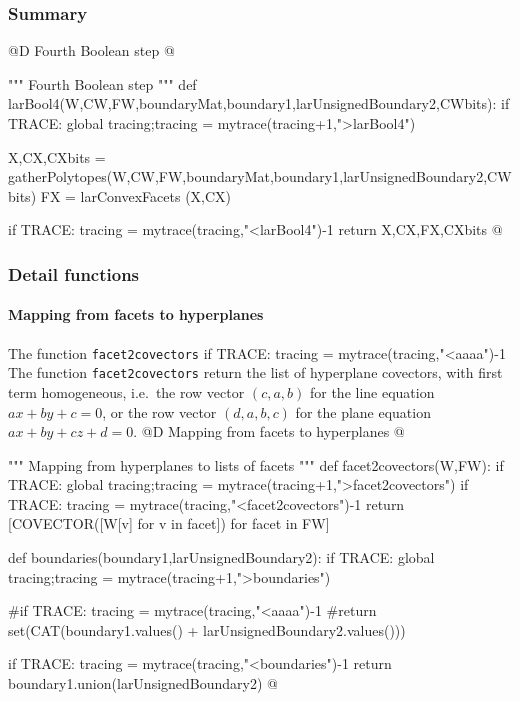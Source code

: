 \documentclass[11pt,oneside]{article}	%
\begin{document}
\subsubsection{Summary}


@D Fourth Boolean step
@{""" Fourth Boolean step """
def larBool4(W,CW,FW,boundaryMat,boundary1,larUnsignedBoundary2,CWbits):
	if TRACE: global tracing;tracing = mytrace(tracing+1,">larBool4")

	X,CX,CXbits = gatherPolytopes(W,CW,FW,boundaryMat,boundary1,larUnsignedBoundary2,CWbits)
	FX = larConvexFacets (X,CX)

	if TRACE: tracing = mytrace(tracing,"<larBool4")-1
	return X,CX,FX,CXbits
@}


\subsubsection{Detail functions}




\paragraph{Mapping from facets to hyperplanes}

The function \texttt{facet2covectors} if TRACE: tracing = mytrace(tracing,"<aaaa")-1
The function \texttt{facet2covectors} return the list of hyperplane covectors, with first term homogeneous, i.e.~the row vector $(c,a,b)$ for the line equation $ax+by+c=0$, or the row vector $(d,a,b,c)$ for the plane equation $ax+by+cz+d=0$.
@D Mapping from facets to hyperplanes
@{""" Mapping from hyperplanes to lists of facets """
def facet2covectors(W,FW):
	if TRACE: global tracing;tracing = mytrace(tracing+1,">facet2covectors")
	if TRACE: tracing = mytrace(tracing,"<facet2covectors")-1
	return [COVECTOR([W[v] for v in facet]) for facet in FW]

def boundaries(boundary1,larUnsignedBoundary2):
	if TRACE: global tracing;tracing = mytrace(tracing+1,">boundaries")

	#if TRACE: tracing = mytrace(tracing,"<aaaa")-1
	#return set(CAT(boundary1.values() + larUnsignedBoundary2.values()))

	if TRACE: tracing = mytrace(tracing,"<boundaries")-1
	return boundary1.union(larUnsignedBoundary2)
@}
\end{document}
